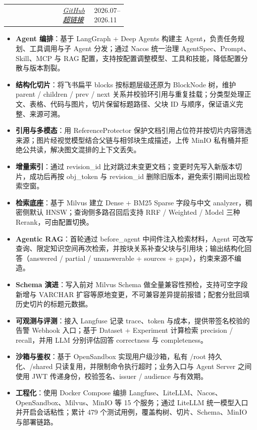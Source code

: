 \documentclass{resume-photo}
\makeatletter
\renewcommand{\heiti}{\bfseries}
\newcommand{\ResumeItemRow}[3]{%
  \par\noindent
  \begin{tabularx}{\linewidth}{@{} >{\raggedright\arraybackslash}X >{\centering\arraybackslash}p{0.26\linewidth} >{\raggedleft\arraybackslash}p{0.22\linewidth} @{}}
    {\heiti #1} & {\textit{#2}} & {#3} \\
  \end{tabularx}
  \par\vspace{1pt}%
}
\makeatother
\begin{document}
\vspace{2pt}
\ResumeItemRow{企业知识库问答 Agent}{\href{https://github.com/JJ-front/Rag-Agent}{\textcolor{ResumeBlue}{GitHub超链接}}}{2026.07--2026.11}
\begin{itemize}
  \item \textbf{Agent 编排}：基于 LangGraph + Deep Agents 构建主 Agent，负责任务规划、工具调用与子 Agent 分发；通过 Nacos 统一治理 AgentSpec、Prompt、Skill、MCP 与 RAG 配置，支持按配置调整模型、工具和技能，降低配置分散与版本割裂。
  \item \textbf{结构化切片}：将飞书扁平 blocks 按标题层级还原为 BlockNode 树，维护 parent / children / prev / next 关系并校验环引用与重复挂载；分类型处理正文、表格、代码与图片，切片保留标题路径、父块 ID 与顺序，保证语义完整、来源可溯。
  \item \textbf{引用与多模态}：用 ReferenceProtector 保护文档引用占位符并按切片内容筛选来源；图片经视觉模型结合父链与相邻块生成描述，上传 MinIO 私有桶并拒绝公共读，解决图文混排的上下文丢失。
  \item \textbf{增量索引}：通过 revision\_id 比对跳过未变更文档；变更时先写入新版本切片，成功后再按 obj\_token 与 revision\_id 删除旧版本，避免索引期间出现检索空窗。
  \item \textbf{检索底座}：基于 Milvus 建立 Dense + BM25 Sparse 字段与中文 analyzer，稠密侧默认 HNSW；查询侧多路召回后支持 RRF / Weighted / Model 三种 Rerank，可由配置切换。
  \item \textbf{Agentic RAG}：首轮通过 before\_agent 中间件注入检索材料，Agent 可改写查询、限定知识空间再次检索，并按块关系补查父块与引用块；输出结构化回答（answered / partial / unanswerable + sources + gaps），约束来源不编造。
  \item \textbf{Schema 演进}：写入前对 Milvus Schema 做全量兼容性预检，支持可空字段新增与 VARCHAR 扩容等原地变更，不可兼容差异提前报错；配套分批回填历史切片的标题元数据。
  \item \textbf{可观测与评测}：接入 Langfuse 记录 trace、token 与成本，提供带签名校验的告警 Webhook 入口；基于 Dataset + Experiment 计算检索 precision / recall，并用 LLM 分别评估回答 correctness 与 completeness。
  \item \textbf{沙箱与鉴权}：基于 OpenSandbox 实现用户级沙箱，私有 /root 持久化、/shared 只读复用，并限制命令执行超时；业务入口与 Agent Server 之间使用 JWT 传递身份，校验签名、issuer / audience 与有效期。
  \item \textbf{工程化}：使用 Docker Compose 编排 Langfuse、LiteLLM、Nacos、OpenSandbox、Milvus、MinIO 等 15 个服务；通过 LiteLLM 统一模型入口并开启会话粘性；累计 479 个测试用例，覆盖构树、切片、Schema、MinIO 与部署链路。
\end{itemize}
\end{document}
